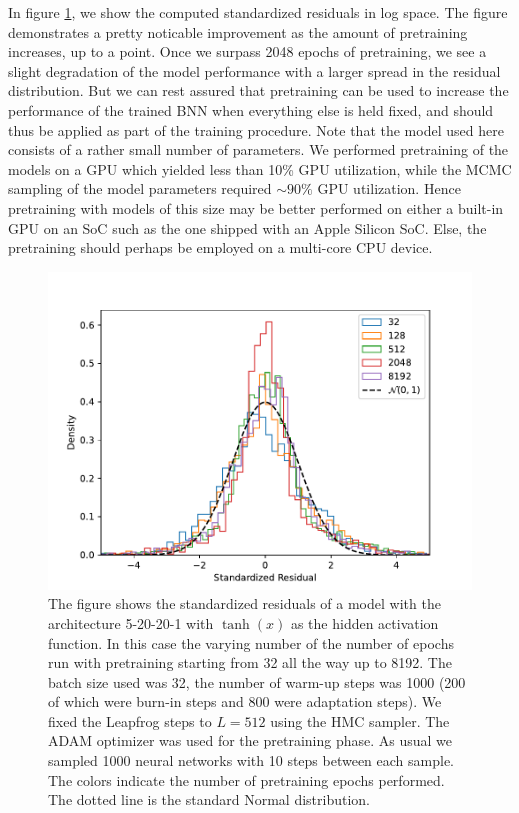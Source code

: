 In figure \ref{fig:std_residual_vs_pretraining}, we
show the computed standardized residuals in log space. The figure demonstrates a pretty noticable improvement as the amount of pretraining increases, up to a point. Once we surpass 2048 epochs of pretraining, we see a slight degradation of the model performance with a larger spread in the residual distribution. But we can rest assured that pretraining can be used to increase the performance of the trained BNN when everything else is held fixed, and should thus be applied as part of the training procedure. Note that the model used here consists of a rather small number of parameters. We performed pretraining of the models on a GPU which yielded less than 10\% GPU utilization, while the MCMC sampling of the model parameters required $\sim 90\%$ GPU utilization. Hence pretraining with models of this size may be better performed on either a built-in GPU on an SoC such as the one shipped with an Apple Silicon SoC. Else, the pretraining should perhaps be employed on a multi-core CPU device.
\begin{figure}[H]
    \centering
    \includegraphics[scale=0.7]{figures/standardized_residuals/effect_of_pretraining/standardized_residuals_hmc_vs_pretraining_steps.pdf}
    \caption{The figure shows the standardized residuals of a model with the architecture 5-20-20-1 with $\tanh(x)$ as the
    hidden activation function. In this case the varying number of the number of epochs run with pretraining starting from 32 all the way up to 8192. The batch size used was 32, the number of warm-up steps was 1000 (200 of which were burn-in steps and 800 were adaptation steps). We fixed the Leapfrog steps to $L = 512$ using the HMC sampler. The ADAM optimizer was used for the pretraining phase. As usual we sampled 1000 neural networks with 10 steps between each sample. The colors indicate the number of pretraining epochs performed. The dotted line is the standard Normal distribution.
    }
    \label{fig:std_residual_vs_pretraining}
\end{figure}

